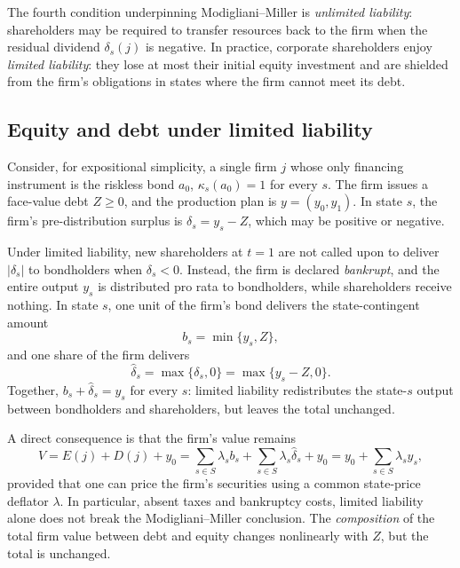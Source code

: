 \documentclass[11pt,a4paper,oneside]{book}
\def\geq{\geqslant}
\theoremstyle{plain}
\theoremstyle{definition}
\theoremstyle{remark}
\numberwithin{equation}{chapter}
\begin{document}
The fourth condition underpinning Modigliani--Miller is \emph{unlimited liability}: shareholders may be required to transfer resources back to the firm when the residual dividend $\delta_s(j)$ is negative.
In practice, corporate shareholders enjoy \emph{limited liability}: they lose at most their initial equity investment and are shielded from the firm's obligations in states where the firm cannot meet its debt.

\subsection{Equity and debt under limited liability}

Consider, for expositional simplicity, a single firm $j$ whose only financing instrument is the riskless bond $a_0$, $\kappa_s(a_0) = 1$ for every $s$.
The firm issues a face-value debt $Z \geq 0$, and the production plan is $y = (y_0, y_1)$.
In state $s$, the firm's pre-distribution surplus is $\delta_s = y_s - Z$, which may be positive or negative.

Under limited liability, new shareholders at $t=1$ are not called upon to deliver $|\delta_s|$ to bondholders when $\delta_s < 0$.
Instead, the firm is declared \emph{bankrupt}, and the entire output $y_s$ is distributed pro rata to bondholders, while shareholders receive nothing.
In state $s$, one unit of the firm's bond delivers the state-contingent amount
\begin{equation}\label{eq:levered-bond}
  b_s = \min\{y_s, Z\},
\end{equation}
and one share of the firm delivers
\begin{equation}\label{eq:levered-equity}
  \widehat{\delta}_s = \max\{\delta_s, 0\} = \max\{y_s - Z, 0\}.
\end{equation}
Together, $b_s + \widehat{\delta}_s = y_s$ for every $s$: limited liability redistributes the state-$s$ output between bondholders and shareholders, but leaves the total unchanged.

A direct consequence is that the firm's value remains
\begin{equation*}
  V = E(j) + D(j) + y_0 = \sum_{s \in S} \lambda_s b_s + \sum_{s \in S} \lambda_s \widehat{\delta}_s + y_0 = y_0 + \sum_{s \in S} \lambda_s y_s,
\end{equation*}
provided that one can price the firm's securities using a common state-price deflator $\lambda$.
In particular, absent taxes and bankruptcy costs, limited liability alone does not break the Modigliani--Miller conclusion.
The \emph{composition} of the total firm value between debt and equity changes nonlinearly with $Z$, but the total is unchanged.
\end{document}
